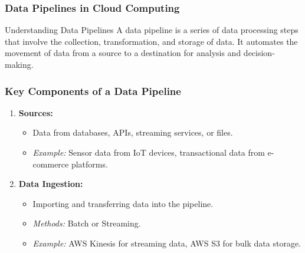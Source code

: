 \documentclass[aspectratio=169]{beamer}
\begin{document}
\begin{frame}[fragile]
    \frametitle{Data Pipelines in Cloud Computing}
    \begin{block}{Understanding Data Pipelines}
        A data pipeline is a series of data processing steps that involve the collection, transformation, and storage of data. It automates the movement of data from a source to a destination for analysis and decision-making.
    \end{block}
\end{frame}

\begin{frame}[fragile]
    \frametitle{Key Components of a Data Pipeline}
    \begin{enumerate}
        \item \textbf{Sources:}
            \begin{itemize}
                \item Data from databases, APIs, streaming services, or files.
                \item \textit{Example:} Sensor data from IoT devices, transactional data from e-commerce platforms.
            \end{itemize}
        \item \textbf{Data Ingestion:}
            \begin{itemize}
                \item Importing and transferring data into the pipeline.
                \item \textit{Methods:} Batch or Streaming.
                \item \textit{Example:} AWS Kinesis for streaming data, AWS S3 for bulk data storage.
            \end{itemize}
    \end{enumerate}
\end{frame}
\end{document}
